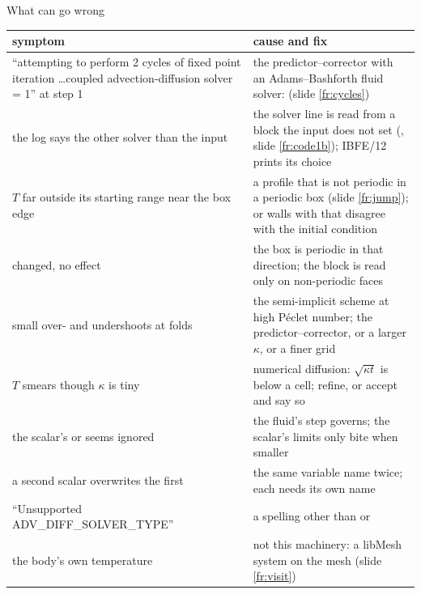 \documentclass[aspectratio=169,11pt]{beamer}
\begin{document}
\begin{frame}{What can go wrong}
\label{fr:wrong}
\scriptsize
\renewcommand{\arraystretch}{0.95}
\begin{tabular}{@{}L{0.38\textwidth}L{0.54\textwidth}@{}}
\toprule
symptom & cause and fix \\
\midrule
``attempting to perform 2 cycles of fixed point iteration \ldots coupled advection-diffusion solver = 1'' at step 1 & the predictor--corrector with an Adams--Bashforth fluid solver:  (slide \ref{fr:cycles}) \\
the log says the other solver than the input & the solver line is read from a block the input does not set (, slide \ref{fr:code1b}); IBFE/12 prints its choice \\
$T$ far outside its starting range near the box edge & a profile that is not periodic in a periodic box (slide \ref{fr:jump}); or walls with  that disagree with the initial condition \\
 changed, no effect & the box is periodic in that direction; the block is read only on non-periodic faces \\
small over- and undershoots at folds & the semi-implicit scheme at high P\'eclet number; the predictor--corrector, or a larger $\kappa$, or a finer grid \\
$T$ smears though $\kappa$ is tiny & numerical diffusion: $\sqrt{\kappa t}$ is below a cell; refine, or accept and say so \\
the scalar's  or  seems ignored & the fluid's step governs; the scalar's limits only bite when smaller \\
a second scalar overwrites the first & the same variable name twice; each  needs its own name \\
``Unsupported ADV\_DIFF\_SOLVER\_TYPE'' & a spelling other than  or  \\
the body's own temperature & not this machinery: a libMesh system on the mesh (slide \ref{fr:visit}) \\
\bottomrule
\end{tabular}
\end{frame}
\end{document}
